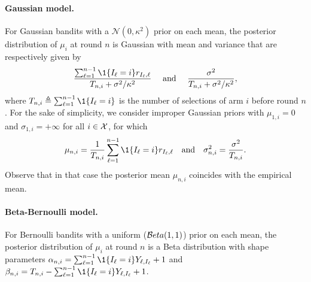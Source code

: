 \paragraph{Gaussian model.} For Gaussian bandits with a $\mathcal{N}(0,\kappa^2)$ prior on each mean, the posterior distribution of $\mu_i$ at round $n$ is Gaussian with mean and variance that are respectively given by
\[\frac{\sum_{\ell=1}^{n-1} \1\{I_\ell = i\} r_{I_\ell,\ell}}{T_{n,i} + \sigma^2/\kappa^2}\quad\text{ and }\quad \frac{\sigma^2}{T_{n,i} + \sigma^2/\kappa^2},\]
where $T_{n,i}\eqdef\sum_{\ell=1}^{n-1} \1{\{ I_{\ell} = i \}}$ is the number of selections of arm $i$ before round $n$.
% 
For the sake of simplicity, we consider improper Gaussian priors with $\mu_{1,i}=0$ and $\sigma_{1,i}=+\infty$ for all $i\in\mathcal{X}$, for which
\[
    \mu_{n,i}  = \frac{1}{T_{n,i}} \sum_{\ell=1}^{n-1} \1\{I_\ell = i\}r_{I_\ell,\ell} \quad \text{and} \quad \sigma_{n,i}^2 = \frac{\sigma^2}{T_{n,i}}.
\]
Observe that in that case the posterior mean $\mu_{n,i}$ coincides with the empirical mean.

\paragraph{Beta-Bernoulli model.} For Bernoulli bandits with a uniform ($\mathcal{B} eta(1,1)$) prior on each mean, the posterior distribution of $\mu_i$ at round $n$ is a Beta distribution with shape parameters $\alpha_{n,i} = \sum_{\ell=1}^{n-1} \1{\{ I_{\ell} = i \}} Y_{\ell,I_{\ell}} +1$ and $\beta_{n,i} = T_{n,i} - \sum_{\ell=1}^{n-1} \1{\{ I_{\ell} = i \}} Y_{\ell,I_{\ell}} + 1$. 

